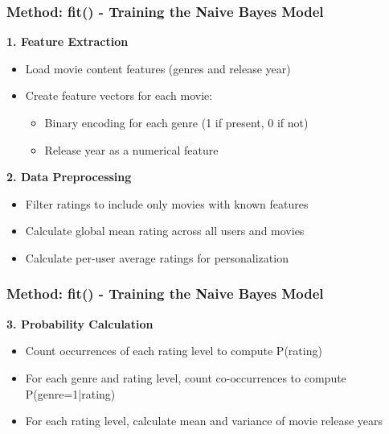 \documentclass{beamer}
\begin{document}
\begin{frame}
\frametitle{Method: fit() - Training the Naive Bayes Model}

    \textbf{1. Feature Extraction}
    \begin{itemize}
        \item Load movie content features (genres and release year)
        \item Create feature vectors for each movie:
        \begin{itemize}
            \item Binary encoding for each genre (1 if present, 0 if not)
            \item Release year as a numerical feature
        \end{itemize}
    \end{itemize}

    \vspace{0.5cm}
    
    \textbf{2. Data Preprocessing}
    \begin{itemize}
        \item Filter ratings to include only movies with known features
        \item Calculate global mean rating across all users and movies
        \item Calculate per-user average ratings for personalization
    \end{itemize}
\end{frame}

\begin{frame}
\frametitle{Method: fit() - Training the Naive Bayes Model}
    \textbf{3. Probability Calculation}
    \begin{itemize}
        \item Count occurrences of each rating level to compute P(rating)
        \item For each genre and rating level, count co-occurrences to compute P(genre=1|rating)
        \item For each rating level, calculate mean and variance of movie release years
    \end{itemize}
\end{frame}
\end{document}
